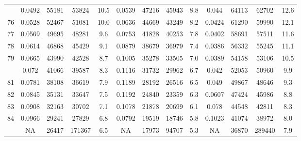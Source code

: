 \documentclass[
  14pt,
]{article}
\begin{document}
\begin{longtable}[t]{lcccccccccccc}
\addlinespace
75 & 0.0492 & 55181 & 53824 & 10.5 & 0.0539 & 47216 & 45943 & 8.8 & 0.044 & 64113 & 62702 & 12.6\\
76 & 0.0528 & 52467 & 51081 & 10.0 & 0.0636 & 44669 & 43249 & 8.2 & 0.0424 & 61290 & 59990 & 12.1\\
77 & 0.0569 & 49695 & 48281 & 9.6 & 0.0753 & 41828 & 40253 & 7.8 & 0.0402 & 58691 & 57511 & 11.6\\
78 & 0.0614 & 46868 & 45429 & 9.1 & 0.0879 & 38679 & 36979 & 7.4 & 0.0386 & 56332 & 55245 & 11.1\\
79 & 0.0665 & 43990 & 42528 & 8.7 & 0.1005 & 35278 & 33505 & 7.0 & 0.0389 & 54158 & 53106 & 10.5\\
\addlinespace
80 & 0.072 & 41066 & 39587 & 8.3 & 0.1116 & 31732 & 29962 & 6.7 & 0.042 & 52053 & 50960 & 9.9\\
81 & 0.0781 & 38108 & 36619 & 7.9 & 0.1189 & 28192 & 26516 & 6.5 & 0.049 & 49867 & 48646 & 9.3\\
82 & 0.0845 & 35131 & 33647 & 7.5 & 0.1192 & 24840 & 23359 & 6.3 & 0.0607 & 47424 & 45986 & 8.8\\
83 & 0.0908 & 32163 & 30702 & 7.1 & 0.1078 & 21878 & 20699 & 6.1 & 0.078 & 44548 & 42811 & 8.3\\
84 & 0.0966 & 29241 & 27829 & 6.8 & 0.0792 & 19519 & 18746 & 5.8 & 0.1023 & 41074 & 38972 & 8.0\\
\addlinespace
85 & NA & 26417 & 171367 & 6.5 & NA & 17973 & 94707 & 5.3 & NA & 36870 & 289440 & 7.9\\*
\end{longtable}
\end{document}
